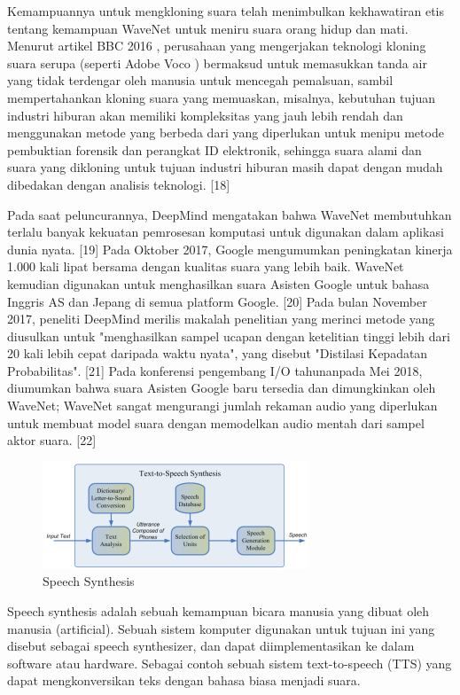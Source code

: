 Kemampuannya untuk mengkloning suara telah menimbulkan kekhawatiran etis tentang kemampuan WaveNet untuk meniru suara orang hidup dan mati. Menurut artikel BBC 2016 , perusahaan yang mengerjakan teknologi kloning suara serupa (seperti Adobe Voco ) bermaksud untuk memasukkan tanda air yang tidak terdengar oleh manusia untuk mencegah pemalsuan, sambil mempertahankan kloning suara yang memuaskan, misalnya, kebutuhan tujuan industri hiburan akan memiliki kompleksitas yang jauh lebih rendah dan menggunakan metode yang berbeda dari yang diperlukan untuk menipu metode pembuktian forensik dan perangkat ID elektronik, sehingga suara alami dan suara yang dikloning untuk tujuan industri hiburan masih dapat dengan mudah dibedakan dengan analisis teknologi. [18]

Pada saat peluncurannya, DeepMind mengatakan bahwa WaveNet membutuhkan terlalu banyak kekuatan pemrosesan komputasi untuk digunakan dalam aplikasi dunia nyata. [19] Pada Oktober 2017, Google mengumumkan peningkatan kinerja 1.000 kali lipat bersama dengan kualitas suara yang lebih baik. WaveNet kemudian digunakan untuk menghasilkan suara Asisten Google untuk bahasa Inggris AS dan Jepang di semua platform Google. [20] Pada bulan November 2017, peneliti DeepMind merilis makalah penelitian yang merinci metode yang diusulkan untuk "menghasilkan sampel ucapan dengan ketelitian tinggi lebih dari 20 kali lebih cepat daripada waktu nyata", yang disebut "Distilasi Kepadatan Probabilitas". [21] Pada konferensi pengembang I/O tahunanpada Mei 2018, diumumkan bahwa suara Asisten Google baru tersedia dan dimungkinkan oleh WaveNet; WaveNet sangat mengurangi jumlah rekaman audio yang diperlukan untuk membuat model suara dengan memodelkan audio mentah dari sampel aktor suara. [22]

\begin{figure}[H]
        \centerline{\includegraphics[scale=.75]{figures/speech}}
        \caption{Speech Synthesis}
		\label{speech}
\end{figure}

Speech synthesis adalah sebuah kemampuan bicara manusia yang dibuat oleh manusia (artificial). Sebuah sistem komputer digunakan untuk tujuan ini yang disebut sebagai speech synthesizer, dan dapat diimplementasikan ke dalam software atau hardware. Sebagai contoh sebuah sistem text-to-speech (TTS) yang dapat mengkonversikan teks dengan bahasa biasa menjadi suara.

